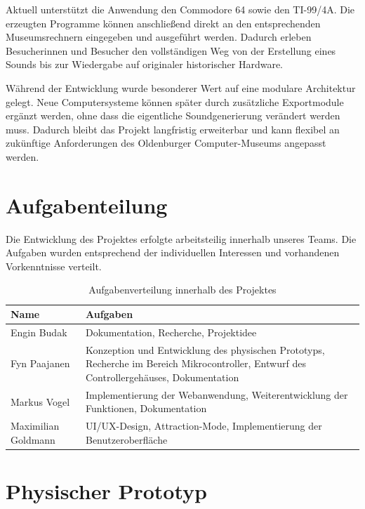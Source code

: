 Aktuell unterstützt die Anwendung den Commodore 64 sowie den TI-99/4A. Die erzeugten
Programme können anschließend direkt an den entsprechenden Museumsrechnern
eingegeben und ausgeführt werden. Dadurch erleben Besucherinnen und Besucher den
vollständigen Weg von der Erstellung eines Sounds bis zur Wiedergabe auf originaler
historischer Hardware.

Während der Entwicklung wurde besonderer Wert auf eine modulare Architektur gelegt.
Neue Computersysteme können später durch zusätzliche Exportmodule ergänzt werden,
ohne dass die eigentliche Soundgenerierung verändert werden muss. Dadurch bleibt das
Projekt langfristig erweiterbar und kann flexibel an zukünftige Anforderungen des
Oldenburger Computer-Museums angepasst werden.

\section{Aufgabenteilung}

Die Entwicklung des Projektes erfolgte arbeitsteilig innerhalb unseres Teams. Die
Aufgaben wurden entsprechend der individuellen Interessen und vorhandenen
Vorkenntnisse verteilt.

\begin{table}[H]
\centering
\begin{tabular}{|p{3.5cm}|p{10cm}|}
\hline
\textbf{Name} & \textbf{Aufgaben} \\ \hline
Engin Budak &
Dokumentation, Recherche, Projektidee \\ \hline

Fyn Paajanen &
Konzeption und Entwicklung des physischen Prototyps,
Recherche im Bereich Mikrocontroller,
Entwurf des Controllergehäuses,
Dokumentation \\ \hline

Markus Vogel &
Implementierung der Webanwendung,
Weiterentwicklung der Funktionen,
Dokumentation \\ \hline

Maximilian Goldmann &
UI/UX-Design,
Attraction-Mode,
Implementierung der Benutzeroberfläche \\ \hline

\end{tabular}
\caption{Aufgabenverteilung innerhalb des Projektes}
\end{table}

\section{Physischer Prototyp}

